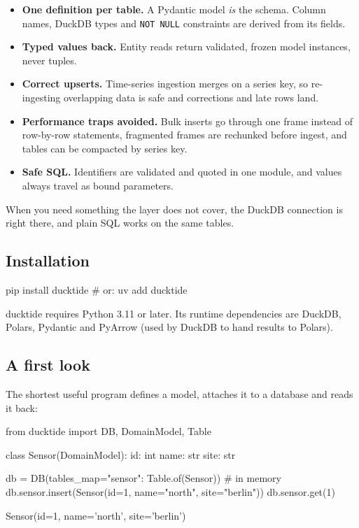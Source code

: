 \documentclass[11pt,a4paper]{article}
\newcommand{\code}[1]{\texttt{#1}}
\begin{document}
\begin{itemize}
  \item \textbf{One definition per table.} A Pydantic model \emph{is} the schema. Column
    names, DuckDB types and \code{NOT NULL} constraints are derived from its fields.
  \item \textbf{Typed values back.} Entity reads return validated, frozen model instances,
    never tuples.
  \item \textbf{Correct upserts.} Time-series ingestion merges on a series key, so
    re-ingesting overlapping data is safe and corrections and late rows land.
  \item \textbf{Performance traps avoided.} Bulk inserts go through one frame instead of
    row-by-row statements, fragmented frames are rechunked before ingest, and tables can
    be compacted by series key.
  \item \textbf{Safe SQL.} Identifiers are validated and quoted in one module, and values
    always travel as bound parameters.
\end{itemize}

When you need something the layer does not cover, the DuckDB connection is right there,
and plain SQL works on the same tables.

\subsection{Installation}

\begin{console}
pip install ducktide        # or: uv add ducktide
\end{console}

ducktide requires Python 3.11 or later. Its runtime dependencies are DuckDB, Polars,
Pydantic and PyArrow (used by DuckDB to hand results to Polars).

\subsection{A first look}

The shortest useful program defines a model, attaches it to a database and reads it
back:

\begin{python}
from ducktide import DB, DomainModel, Table

class Sensor(DomainModel):
    id: int
    name: str
    site: str

db = DB(tables_map={"sensor": Table.of(Sensor)})   # in memory
db.sensor.insert(Sensor(id=1, name="north", site="berlin"))
db.sensor.get(1)
\end{python}
\begin{console}
Sensor(id=1, name='north', site='berlin')
\end{console}
\end{document}
